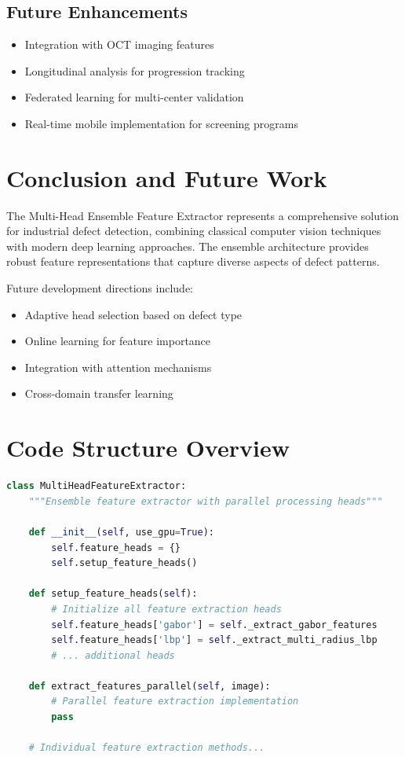 \documentclass[12pt,a4paper]{article}
\begin{document}
\subsection{Future Enhancements}
\begin{itemize}
    \item Integration with OCT imaging features
    \item Longitudinal analysis for progression tracking
    \item Federated learning for multi-center validation
    \item Real-time mobile implementation for screening programs
\end{itemize}

\section{Conclusion and Future Work}

The Multi-Head Ensemble Feature Extractor represents a comprehensive solution for industrial defect detection, combining classical computer vision techniques with modern deep learning approaches. The ensemble architecture provides robust feature representations that capture diverse aspects of defect patterns.

Future development directions include:
\begin{itemize}
    \item Adaptive head selection based on defect type
    \item Online learning for feature importance
    \item Integration with attention mechanisms
    \item Cross-domain transfer learning
\end{itemize}

\printbibliography

\appendix
\section{Code Structure Overview}

\begin{lstlisting}[language=Python, caption=Main Class Structure]
class MultiHeadFeatureExtractor:
    """Ensemble feature extractor with parallel processing heads"""

    def __init__(self, use_gpu=True):
        self.feature_heads = {}
        self.setup_feature_heads()

    def setup_feature_heads(self):
        # Initialize all feature extraction heads
        self.feature_heads['gabor'] = self._extract_gabor_features
        self.feature_heads['lbp'] = self._extract_multi_radius_lbp
        # ... additional heads

    def extract_features_parallel(self, image):
        # Parallel feature extraction implementation
        pass

    # Individual feature extraction methods...
\end{lstlisting}
\end{document}

